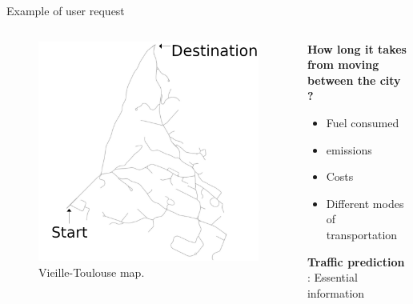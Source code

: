 \documentclass[Ligatures=TeX,table,svgnames,usetotalslideindicator,compress,10pt,aspectratio=169]{beamer}
\begin{document}
\begin{frame}{Example of user request} 
\begin{columns}

\begin{column}{0.5\textwidth}

   \begin{figure}[!h]
        \centering
        \includegraphics[width=\textwidth]{images/vieille_toulouse.png}
            \caption{Vieille-Toulouse map.}
      \end{figure}
      \end{column}
\begin{column}{0.5\textwidth}

\textbf{How long it takes from moving between the city ?}
\begin{itemize}
    \item Fuel consumed    
    \item {} emissions
    \item Costs
    \item Different modes of transportation
\end{itemize}
\pause
\textbf{Traffic prediction} : Essential information
\end{column}



\end{columns}
\end{frame}
\end{document}
